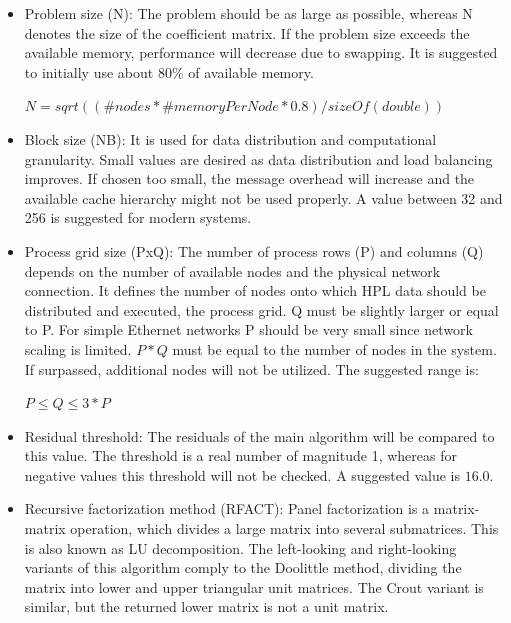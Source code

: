 \documentclass[10pt,twocolumn]{article}
\begin{document}
\begin{itemize}

\item Problem size (N): The problem should be as large as possible, whereas N denotes the size of the coefficient matrix. If the problem size exceeds the available memory, performance will decrease due to swapping. It is suggested to initially use about 80\% of available memory.
\begin{center}
$ N = sqrt ( ( \#nodes * \#memoryPerNode * 0.8 ) / sizeOf(double) )$
\end{center}

\item Block size (NB): It is used for data distribution and computational granularity. Small values are desired as data distribution and load balancing improves. If chosen too small, the message overhead will increase and the available cache hierarchy might not be used properly. A value between 32 and 256 is suggested for modern systems.

\item Process grid size (PxQ): The number of process rows (P) and columns (Q) depends on the number of available nodes and the physical network connection. It defines the number of nodes onto which HPL data should be distributed and executed, the process grid. Q must be slightly larger or equal to P. For simple Ethernet networks P should be very small since network scaling is limited. $P*Q$ must be equal to the number of nodes in the system. If surpassed, additional nodes will not be utilized. The suggested range is:
\begin{center}
$P \leq Q \leq 3*P$	
\end{center}

\item Residual threshold: The residuals of the main algorithm will be compared to this value. The threshold is a real number of magnitude 1, whereas for negative values this threshold will not be checked. A suggested value is $16.0$.

\item Recursive factorization method (RFACT): Panel factorization is a matrix-matrix operation, which divides a large matrix into several submatrices. This is also known as LU decomposition. The left-looking and right-looking variants of this algorithm comply to the Doolittle method, dividing the matrix into lower and upper triangular unit matrices. The Crout variant is similar, but the returned lower matrix is not a unit matrix.


\end{itemize}
\end{document}
